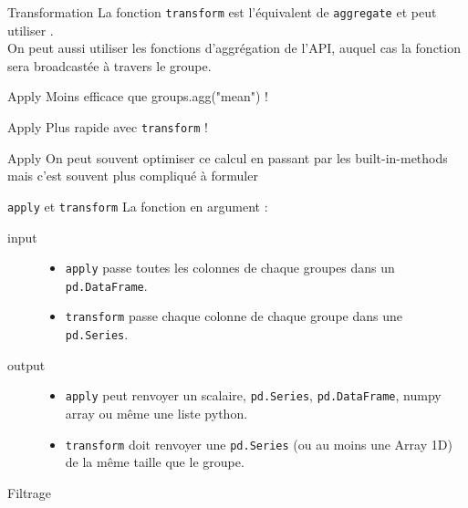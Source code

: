 \begin{frame}{Transformation}
  La fonction \texttt{transform} est l'équivalent de \texttt{aggregate} et peut utiliser
  . \\
  On peut aussi utiliser les fonctions d'aggrégation de l'API, auquel cas la fonction sera broadcastée à travers le groupe. 
\end{frame}

\begin{frame}{Apply}
  Moins efficace que groups.agg("mean") !
\end{frame}

\begin{frame}{Apply}
  Plus rapide avec \texttt{transform} !
\end{frame}

\begin{frame}{Apply}
  On peut souvent optimiser ce calcul en passant par les built-in-methods mais c'est souvent plus compliqué à formuler \\
\end{frame}

\begin{frame}{\texttt{apply} et \texttt{transform}}
  La fonction en argument :
  \begin{description}
    \item[input]  \begin{itemize}
                    \item \texttt{apply} passe toutes les colonnes de chaque groupes dans un \texttt{pd.DataFrame}.
                    \item \texttt{transform} passe chaque colonne de chaque groupe dans une \texttt{pd.Series}.
                  \end{itemize}
    \item[output]  \begin{itemize}
                    \item \texttt{apply} peut renvoyer un scalaire, \texttt{pd.Series}, \texttt{pd.DataFrame}, numpy array ou même une liste python.
                    \item \texttt{transform} doit renvoyer une \texttt{pd.Series} (ou au moins une Array 1D) de la même taille que le groupe.
                  \end{itemize}
  \end{description}
\end{frame}

\begin{frame}{Filtrage}
\end{frame}
